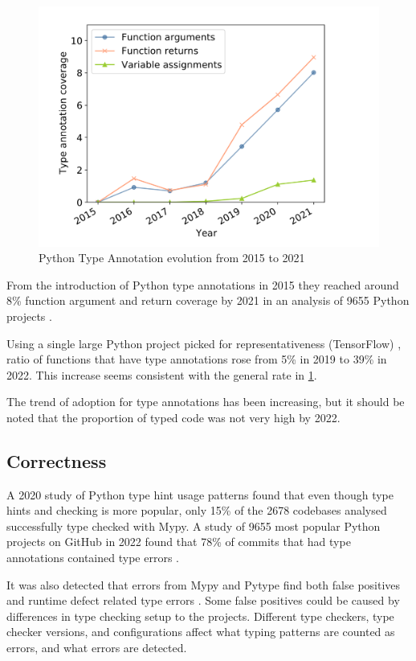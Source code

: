 \begin{figure}
    \centering
    \includegraphics[width=0.5\linewidth]{Screenshot 2024-12-05 at 15.37.59.png}
    \caption{Python Type Annotation evolution from 2015 to 2021 \cite{di_grazia_evolution_2022}}
    \label{fig:annotation-evolution}
\end{figure}
From the introduction of Python type annotations in 2015 they reached around 8\% function argument and return coverage by 2021 in an analysis of 9655 Python projects \cite{di_grazia_evolution_2022}. 

Using a single large Python project picked for representativeness (TensorFlow) \cite{lin_towards_large_scale_2023}, ratio of functions that have type annotations rose from 5\% in 2019 to 39\% in 2022. This increase seems consistent with the general rate in \ref{fig:annotation-evolution}.

The trend of adoption for type annotations has been increasing, but it should be noted that the proportion of typed code was not very high by 2022.

\subsection{Correctness}

A 2020 study of Python type hint usage patterns \cite{rak-amnouykit_taleoftwo_2020} found that even though type hints and checking is more popular, only 15\% of the 2678 codebases analysed successfully type checked with Mypy. A study of 9655 most popular Python projects on GitHub in 2022 found that 78\% of commits that had type annotations contained type errors \cite{di_grazia_evolution_2022}.

It was also detected that errors from Mypy and Pytype find both false positives and runtime defect related type errors \cite{rak-amnouykit_taleoftwo_2020}. Some false positives could be caused by differences in type checking setup to the projects. Different type checkers, type checker versions, and configurations affect what typing patterns are counted as errors, and what errors are detected.


